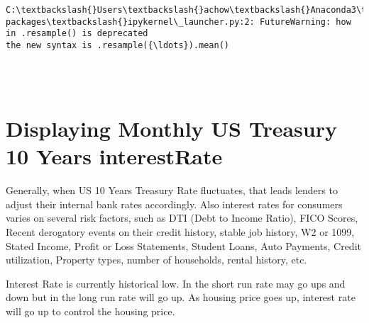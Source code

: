 \documentclass[11pt]{article}
\begin{document}
    \begin{Verbatim}[commandchars=\\\{\}]
C:\textbackslash{}Users\textbackslash{}achow\textbackslash{}Anaconda3\textbackslash{}lib\textbackslash{}site-packages\textbackslash{}ipykernel\_launcher.py:2: FutureWarning: how in .resample() is deprecated
the new syntax is .resample({\ldots}).mean()
  

    \end{Verbatim}

    \begin{center}
    \end{center}
    { \hspace*{\fill} \\}
    
    \section{Displaying Monthly US Treasury 10 Years
interestRate}\label{displaying-monthly-us-treasury-10-years-interestrate}

Generally, when US 10 Years Treasury Rate fluctuates, that leads lenders
to adjust their internal bank rates accordingly. Also interest rates for
consumers varies on several risk factors, such as DTI (Debt to Income
Ratio), FICO Scores, Recent derogatory events on their credit history,
stable job history, W2 or 1099, Stated Income, Profit or Loss
Statements, Student Loans, Auto Payments, Credit utilization, Property
types, number of households, rental history, etc.

Interest Rate is currently historical low. In the short run rate may go
ups and down but in the long run rate will go up. As housing price goes
up, interest rate will go up to control the housing price.
\end{document}
